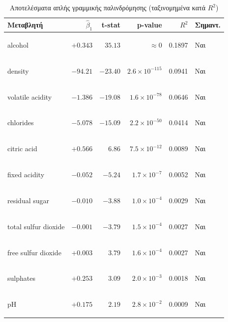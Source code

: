\documentclass[12pt,a4paper]{article}
\begin{document}
\begin{table}[H]
\centering
\caption{Αποτελέσματα απλής γραμμικής παλινδρόμησης (ταξινομημένα κατά $R^2$)}
\label{tab:simple_regression}
\small
\begin{tabular}{lrrrrl}
\toprule
\textbf{Μεταβλητή} & $\hat{\beta}_1$ & \textbf{t-stat} & \textbf{p-value} & $R^2$ & \textbf{Σημαντ.} \\
\midrule
\begin{english}alcohol\end{english}              &  $+0.343$   & $35.13$   & $\approx 0$           & 0.1897 & Ναι \\
\begin{english}density\end{english}              & $-94.21$    & $-23.40$  & $2.6 \times 10^{-115}$ & 0.0941 & Ναι \\
\begin{english}volatile acidity\end{english}     & $-1.386$    & $-19.08$  & $1.6 \times 10^{-78}$  & 0.0646 & Ναι \\
\begin{english}chlorides\end{english}            & $-5.078$    & $-15.09$  & $2.2 \times 10^{-50}$  & 0.0414 & Ναι \\
\begin{english}citric acid\end{english}          &  $+0.566$   & $6.86$    & $7.5 \times 10^{-12}$  & 0.0089 & Ναι \\
\begin{english}fixed acidity\end{english}        & $-0.052$    & $-5.24$   & $1.7 \times 10^{-7}$   & 0.0052 & Ναι \\
\begin{english}residual sugar\end{english}       & $-0.010$    & $-3.88$   & $1.0 \times 10^{-4}$   & 0.0029 & Ναι \\
\begin{english}total sulfur dioxide\end{english} & $-0.001$    & $-3.79$   & $1.5 \times 10^{-4}$   & 0.0027 & Ναι \\
\begin{english}free sulfur dioxide\end{english}  &  $+0.003$   & $3.79$    & $1.6 \times 10^{-4}$   & 0.0027 & Ναι \\
\begin{english}sulphates\end{english}            &  $+0.253$   & $3.09$    & $2.0 \times 10^{-3}$   & 0.0018 & Ναι \\
\begin{english}pH\end{english}                   &  $+0.175$   & $2.19$    & $2.8 \times 10^{-2}$   & 0.0009 & Ναι \\
\bottomrule
\end{tabular}
\end{table}
\end{document}

